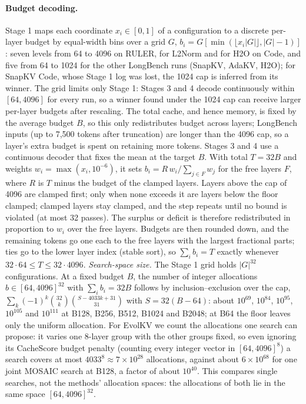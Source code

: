\paragraph{Budget decoding.} Stage 1 maps each coordinate $x_i \in [0,1]$ of a configuration to a discrete per-layer budget by equal-width bins over a grid $G$, $b_i = G[\min(\lfloor x_i |G| \rfloor, |G|-1)]$: seven levels from 64 to 4096 on RULER, for L2Norm and for H2O on Code, and five from 64 to 1024 for the other LongBench runs (SnapKV, AdaKV, H2O); for SnapKV Code, whose Stage 1 log was lost, the 1024 cap is inferred from its winner. The grid limits only Stage 1: Stages 3 and 4 decode continuously within $[64, 4096]$ for every run, so a winner found under the 1024 cap can receive larger per-layer budgets after rescaling. The total cache, and hence memory, is fixed by the average budget $B$, so this only redistributes budget across layers; LongBench inputs (up to 7{,}500 tokens after truncation) are longer than the 4096 cap, so a layer's extra budget is spent on retaining more tokens. Stages 3 and 4 use a continuous decoder that fixes the mean at the target $B$. With total $T = 32B$ and weights $w_i = \max(x_i, 10^{-6})$, it sets $b_i = R\,w_i / \sum_{j \in F} w_j$ for the free layers $F$, where $R$ is $T$ minus the budget of the clamped layers. Layers above the cap of 4096 are clamped first; only when none exceeds it are layers below the floor clamped; clamped layers stay clamped, and the step repeats until no bound is violated (at most 32 passes). The surplus or deficit is therefore redistributed in proportion to $w_i$ over the free layers. Budgets are then rounded down, and the remaining tokens go one each to the free layers with the largest fractional parts; ties go to the lower layer index (stable sort), so $\sum_i b_i = T$ exactly whenever $32 \cdot 64 \le T \le 32 \cdot 4096$. \emph{Search-space size.} The Stage 1 grid holds $|G|^{32}$ configurations. At a fixed budget $B$, the number of integer allocations $b \in [64, 4096]^{32}$ with $\sum_i b_i = 32B$ follows by inclusion--exclusion over the cap, $\sum_k (-1)^k {32 \choose k}{S - 4033k + 31 \choose 31}$ with $S = 32(B - 64)$: about $10^{69}$, $10^{84}$, $10^{95}$, $10^{105}$ and $10^{111}$ at B128, B256, B512, B1024 and B2048; at B64 the floor leaves only the uniform allocation. For EvolKV we count the allocations one search can propose: it varies one 8-layer group with the other groups fixed, so even ignoring its CacheScore budget penalty (counting every integer vector in $[64, 4096]^8$) a search covers at most $4033^8 \approx 7\times10^{28}$ allocations, against about $6\times10^{68}$ for one joint MOSAIC search at B128, a factor of about $10^{40}$. This compares single searches, not the methods' allocation spaces: the allocations of both lie in the same space $[64, 4096]^{32}$.

